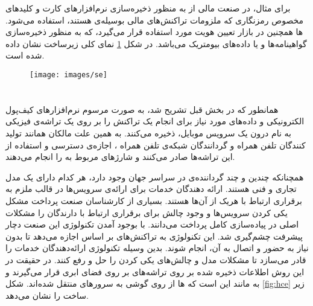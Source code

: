 \documentclass[oneside]{report}
\begin{document}
برای مثال، در صنعت مالی از 
{\normalsize {}}
 به منظور ذخیره‌سازی نرم‌افزار‌های کارت و کلیدهای مخصوص رمزنگاری که ملزومات تراکنش‌های مالی
{\normalsize {}}
بوسیله‌ی 
{\normalsize {}}
هستند، 
استفاده می‌شود. 
{\normalsize {}} ها 
همچنین در بازار تعیین هویت مورد استفاده قرار می‌گیرد، که به منظور ذخیره‌سازی گواهینامه‌ها 
	 	و یا داده‌های بیومتریک 
	 	می‌باشد. در شکل 
	\ref{fig:se}
	نمای کلی زیرساخت 
	{\normalsize  {}}
	نشان داده شده است.

\begin{figure}[h]
	\centering
	\texttt{[image: images/se]}
	\caption{{\footnotesize {}}}
	\label{fig:se}
\end{figure}



\section{{\large {}}}
همانطور که در بخش قبل تشریح شد،
به صورت مرسوم  نرم‌افزارهای کیف‌پول الکترونیکی و
{\normalsize {}}
داده‌های مورد نیاز برای انجام یک تراکنش را بر روی یک تراشه‌ی فیزیکی به نام 
{\normalsize {}}
درون یک سرویس موبایل،
ذخیره می‌کنند. به همین علت مالکان 
{\normalsize {}}
همانند تولید کنندگان تلفن همراه و گردانندگان شبکه‌ی تلفن همراه
{\normalsize {}}
	 	، اجازه‌ی دسترسی و استفاده از این تراشه‌ها  صادر می‌کنند و شارژهای مربوط به 
{\normalsize {}}
را انجام می‌دهند.

همچنانکه چندین و چند گرداننده‌ی 
{\normalsize {}}
در سراسر جهان وجود دارد، هر کدام دارای یک مدل تجاری و فنی هستند. ارائه دهندگان خدمات برای ارائه‌ی سرویس‌ها در قالب
{\normalsize {}}
ملزم به برقراری ارتباط با هریک از آن‌ها هستند. بسیاری از کارشناسان صنعت پرداخت مشکل یکی کردن سرویس‌ها و وجود چالش برای برقراری ارتباط با دارندگان
{\normalsize {}} را
مشکلات اصلی در پیاده‌سازی کامل پرداخت 
{\normalsize {}}
می‌دانند. با بوجود آمدن تکنولوژی 
{\normalsize {}}
این صنعت دچار پیشرفت چشم‌گیری شد. این تکنولوژی به تراکنش‌های بر اساس 
{\normalsize {}}
اجازه می‌دهد تا بدون نیاز به حضور 
{\normalsize {}}
و اتصال به آن، انجام شوند. بدین وسیله تکنولوژی 
{\normalsize {}}
ارائه‌دهندگان خدمات را قادر می‌سازد تا مشکلات مدل 
{\normalsize {}}
و چالش‌های یکی کردن 
را حل و رفع کنند.
در حقیقت در این روش اطلاعات ذخیره شده بر روی تراشه‌های 
{\normalsize {}}
بر روی فضای ابری قرار می‌گیرند و به مانند این است که 
{\normalsize {}}
ها از روی گوشی به سرورهای 
{\normalsize {}}
منتقل شده‌اند. شکل 
\ref{fig:hce}
زیر ساخت 
{\normalsize  {}}
را نشان می‌دهد.
\end{document}

